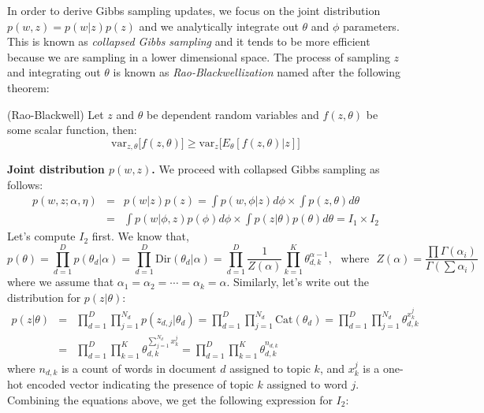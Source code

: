 In order to derive Gibbs sampling updates, we focus on the joint distribution $p(w, z) = p(w|z)p(z)$ and we analytically integrate out $\theta$ and $\phi$ parameters. This is known as \textit{collapsed Gibbs sampling} and it tends to be more efficient because we are sampling in a lower dimensional space. The process of sampling $z$ and integrating out $\theta$ is known as \textit{Rao-Blackwellization} named after the following theorem:
\begin{theorem}
(Rao-Blackwell) Let $z$ and $\theta$ be dependent random variables and $f(z,\theta)$ be some scalar function, then:
\begin{equation}
    \mathrm{var}_{z,\theta}\big[f(z,\theta)\big] \geq \mathrm{var}_z \big[E_\theta [f(z,\theta) | z]\big]
\end{equation}
\end{theorem}
\textbf{Joint distribution $p(w,z)$.}\newline
We proceed with collapsed Gibbs sampling as follows:
\begin{eqnarray}
   p(w,z;\alpha,\eta) &=& p(w|z)p(z) = \int p(w,\phi|z)d\phi \times \int p(z,\theta)d\theta \nonumber \\ 
   &=& \int p(w|\phi,z)p(\phi)d\phi \times \int p(z|\theta)p(\theta)d\theta = I_1 \times I_2 
\end{eqnarray}
Let's compute $I_2$ first. We know that,
\begin{equation}
    p(\theta) = \prod_{d=1}^{D} p(\theta_d|\alpha) = \prod_{d=1}^{D} \mathrm{Dir}(\theta_d|\alpha) = \prod_{d=1}^{D}\frac{1}{Z(\alpha)}\prod_{k=1}^{K}\theta_{d,k}^{\alpha - 1},~~~\mathrm{where}~~~ Z(\alpha) = \frac{\prod \Gamma(\alpha_i)}{\Gamma(\sum \alpha_i)}
\end{equation}
where we assume that $\alpha_1 = \alpha_2 = \cdots = \alpha_k = \alpha$. Similarly, let's write out the distribution for $p(z|\theta)$:
\begin{eqnarray}
    p(z|\theta) &=& \prod_{d=1}^{D}\prod_{j=1}^{N_d}p(z_{d,j}|\theta_d) = \prod_{d=1}^{D}\prod_{j=1}^{N_d}\mathrm{Cat}(\theta_d) = \prod_{d=1}^{D}\prod_{j=1}^{N_d}\theta_{d,k}^{x_{k}^{j}} \nonumber \\ 
    &=& \prod_{d=1}^{D}\prod_{k=1}^{K}\theta_{d,k}^{\sum_{j=1}^{N_d}x_{k}^{j}} = \prod_{d=1}^{D}\prod_{k=1}^{K}\theta_{d,k}^{n_{d,k}} 
\end{eqnarray}
where $n_{d,k}$ is a count of words in document $d$ assigned to topic $k$, and $x_{k}^{j}$ is a one-hot encoded vector indicating the presence of topic $k$ assigned to word $j$. Combining the equations above, we get the following expression for $I_2$:
